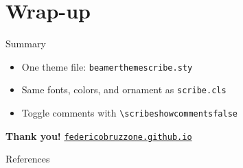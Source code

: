 \documentclass[
	aspectratio=169, %
]{beamer}
\begin{document}
\section{Wrap-up}

\begin{frame}[fragile]{Summary}
	\begin{itemize}
		\item One theme file: \texttt{beamerthemescribe.sty}
		\item Same fonts, colors, and ornament as \texttt{scribe.cls}
		\item Toggle comments with \verb|\scribeshowcommentsfalse|
	\end{itemize}
\end{frame}

\begin{frame}
	\centering
	\vfill
	{\Large\bfseries Thank you!}
	\scribedivider
	\href{https://federicobruzzone.github.io/}{\texttt{federicobruzzone.github.io}}
	\vfill
\end{frame}

\begin{frame}[allowframebreaks]{References}
	
	
\end{frame}
\end{document}
